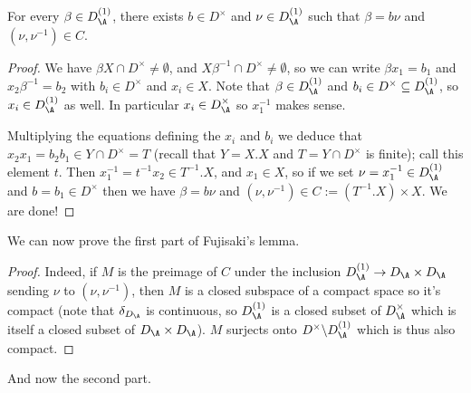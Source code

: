 \begin{lemma}
  \label{NumberField.AdeleRing.DivisionAlgebra.Aux.antidiag_mem_C}
  \leanok
  For every $\beta\in D_{\A}^{(1)}$, there exists $b\in D^\times$
  and $\nu\in D_{\A}^{(1)}$ such that $\beta=b\nu$ and $(\nu,\nu^{-1})\in C.$
\end{lemma}
\begin{proof}
  \leanok
  We have $\beta X\cap D^\times\not=\emptyset$, and $X\beta^{-1}\cap D^\times\not=\emptyset$,
  so we can write $\beta x_1=b_1$ and $x_2\beta^{-1}=b_2$ with $b_i\in D^\times$ and $x_i\in X$.
  Note that $\beta\in D_{\A}^{(1)}$ and $b_i\in D^{\times}\subseteq D_{\A}^{(1)}$, so
  $x_i\in D_{\A}^{(1)}$ as well. In particular $x_i\in D_{\A}^\times$ so $x_1^{-1}$ makes sense.

  Multiplying the equations defining the $x_i$ and $b_i$ we deduce that
  $x_2x_1=b_2b_1\in Y\cap D^\times=T$ (recall that $Y=X.X$ and $T=Y\cap D^\times$ is finite); call
  this element $t$. Then $x_1^{-1}=t^{-1}x_2\in T^{-1}.X$, and $x_1\in X$, so if we set
  $\nu=x_1^{-1}\in D_{\A}^{(1)}$ and $b=b_1\in D^\times$ then we have $\beta=b\nu$ and
  $(\nu,\nu^{-1})\in C := (T^{-1}.X)\times X$. We are done!
\end{proof}

We can now prove the first part of Fujisaki's lemma.

\begin{proof}
  \leanok
  Indeed, if $M$ is the preimage of $C$ under the inclusion $D_{\A}^{(1)} \to D_{\A}\times D_{\A}$
  sending $\nu$ to $(\nu,\nu^{-1})$, then $M$ is a closed subspace of a compact space so it's
  compact (note that $\delta_{D_{\A}}$ is continuous, so $D_{\A}^{(1)}$ is a closed subset of
  $D_{\A}^\times$ which is itself a closed subset of $D_{\A}\times D_{\A}$). $M$ surjects onto
  $D^\times\backslash D_{\A}^{(1)}$ which is thus also compact.
\end{proof}

And now the second part.

